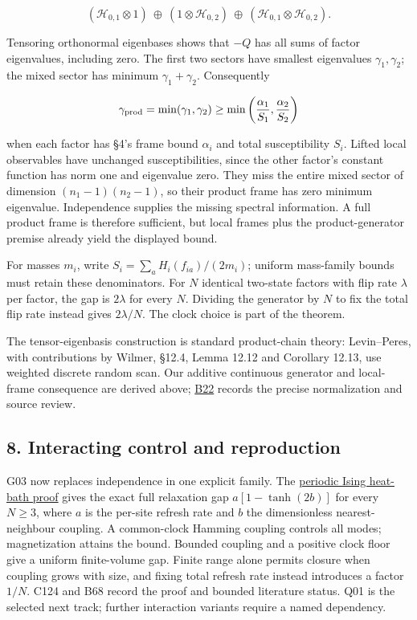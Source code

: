\documentclass[11pt,a4paper]{article}
\begin{document}
\[
(\mathcal H_{0,1}\otimes1)\ \oplus\
(1\otimes\mathcal H_{0,2})\ \oplus\
(\mathcal H_{0,1}\otimes\mathcal H_{0,2}).
\]

Tensoring orthonormal eigenbases shows that \(-Q\) has all sums of
factor eigenvalues, including zero. The first two sectors have smallest
eigenvalues \(\gamma_1,\gamma_2\); the mixed sector has minimum
\(\gamma_1+\gamma_2\). Consequently

\[
\gamma_{\rm prod}=\min(\gamma_1,\gamma_2)
\ge\min\left(\frac{\alpha_1}{S_1},\frac{\alpha_2}{S_2}\right)
\]

when each factor has §4's frame bound \(\alpha_i\) and total
susceptibility \(S_i\). Lifted local observables have unchanged
susceptibilities, since the other factor's constant function has norm
one and eigenvalue zero. They miss the entire mixed sector of dimension
\((n_1-1)(n_2-1)\), so their product frame has zero minimum eigenvalue.
Independence supplies the missing spectral information. A full product
frame is therefore sufficient, but local frames plus the
product-generator premise already yield the displayed bound.

For masses \(m_i\), write \(S_i=\sum_a H_i(f_{ia})/(2m_i)\); uniform
mass-family bounds must retain these denominators. For \(N\) identical
two-state factors with flip rate \(\lambda\) per factor, the gap is
\(2\lambda\) for every \(N\). Dividing the generator by \(N\) to fix the
total flip rate instead gives \(2\lambda/N\). The clock choice is part
of the theorem.

The tensor-eigenbasis construction is standard product-chain theory:
Levin--Peres, with contributions by Wilmer, §12.4, Lemma 12.12 and
Corollary 12.13, use weighted discrete random scan. Our additive
continuous generator and local-frame consequence are derived above;
\href{../references/batches/B22.md}{B22} records the precise
normalization and source review.

\hypertarget{interacting-control-and-reproduction}{%
\subsection{8. Interacting control and
reproduction}\label{interacting-control-and-reproduction}}

G03 now replaces independence in one explicit family. The
\href{interacting-ising-gap.md}{periodic Ising heat-bath proof} gives
the exact full relaxation gap \(a[1-\tanh(2b)]\) for every \(N\ge3\),
where \(a\) is the per-site refresh rate and \(b\) the dimensionless
nearest-neighbour coupling. A common-clock Hamming coupling controls all
modes; magnetization attains the bound. Bounded coupling and a positive
clock floor give a uniform finite-volume gap. Finite range alone permits
closure when coupling grows with size, and fixing total refresh rate
instead introduces a factor \(1/N\). C124 and B68 record the proof and
bounded literature status. Q01 is the selected next track; further
interaction variants require a named dependency.
\end{document}
